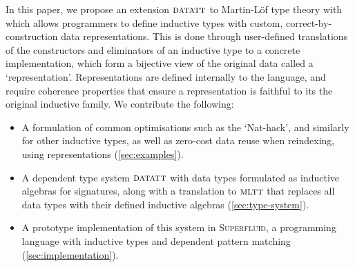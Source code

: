 In this paper, we propose an extension ${\textsc{datatt}}$ to Martin-L\"of type theory with
which allows programmers to define inductive types with custom,
correct-by-construction data representations. This is done through user-defined
translations of the constructors and eliminators of an inductive type to a
concrete implementation, which form a bijective view of the original data called
a `representation'. Representations are defined internally to the language, and
require coherence properties that ensure a representation is faithful to its the
original inductive family. We contribute the following:
\begin{itemize}
    \item A formulation of common optimisations such as the `Nat-hack', and
        similarly for other inductive types, as well as zero-cost data reuse when
        reindexing, using representations (\cref{sec:examples}).
        \item A dependent type system ${\textsc{datatt}}$ with data types formulated
        as inductive algebras for signatures, along with a translation to
        ${\textsc{mltt}}$ that replaces all data types with their defined inductive
        algebras (\cref{sec:type-system}).
        \item A prototype implementation of this system in \textsc{Superfluid},
        a programming language with inductive types and dependent pattern
        matching (\cref{sec:implementation}).
\end{itemize}
